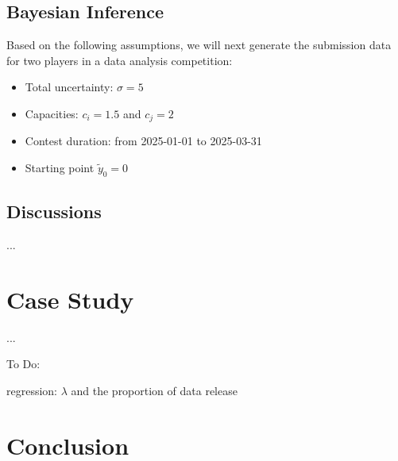 \documentclass[mnsc]{informs3}
\begin{document}
\subsection{Bayesian Inference}

Based on the following assumptions, we will next generate the submission data for two players in a data analysis competition: 
\begin{itemize}
	\item Total uncertainty: $\sigma = 5$
	\item Capacities: $c_i = 1.5$ and $c_j = 2$
	\item Contest duration: from 2025-01-01 to 2025-03-31
	\item Starting point $\tilde{y}_0=0$
\end{itemize}

\subsection{Discussions}

...

\section{Case Study}\label{sec-kaggle-application}

...

To Do:

regression: $\lambda$ and the proportion of data release


\newpage
\section{Conclusion}


%
%
%
\end{document}
